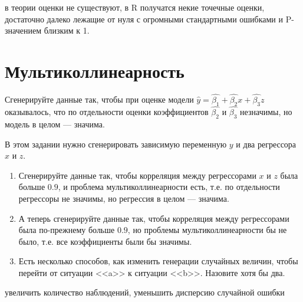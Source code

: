\documentclass[pdftex,11pt,openany]{book}\usepackage[]{graphicx}\usepackage[]{color}
\begin{document}
\begin{solution}
в теории оценки не существуют, в R получатся некие точечные оценки, достаточно далеко лежащие от нуля с огромными стандартными ошибками и P-значением близким к 1.
\end{solution}








\chapter{Мультиколлинеарность}


\begin{problem}
Сгенерируйте данные так, чтобы при оценке модели $\hat{y}=\hat{\beta_1}+\hat{\beta_2}x+\hat{\beta_3}z$ оказывалось, что по отдельности оценки коэффициентов $\hat{\beta_2}$ и $\hat{\beta_3}$ незначимы, но модель в целом --- значима.
\end{problem}
\begin{solution}
\end{solution}

\begin{problem}
В этом задании нужно сгенерировать зависимую переменную $y$ и два регрессора $x$ и $z$.
\begin{enumerate}
\item Сгенерируйте данные так, чтобы корреляция между регрессорами $x$ и $z$ была больше $0.9$, и проблема мультиколлинеарности есть, т.е. по отдельности регрессоры не значимы, но регрессия в целом --- значима.
\item А теперь сгенерируйте данные так, чтобы корреляция между регрессорами была по-прежнему больше $0.9$, но проблемы мультиколлинеарности бы не было, т.е. все коэффициенты были бы значимы.
\item Есть несколько способов, как изменить генерации случайных величин, чтобы перейти от ситуации <<a>> к ситуации <<b>>. Назовите хотя бы два.   
\end{enumerate}
\end{problem}
\begin{solution}
увеличить количество наблюдений, уменьшить дисперсию случайной ошибки
\end{solution}
\end{document}
